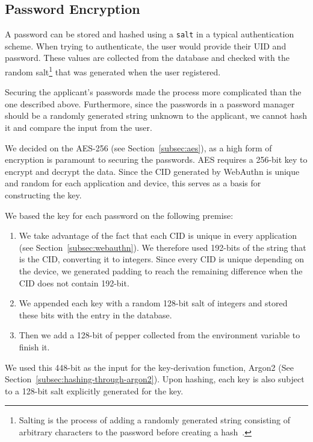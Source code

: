 \subsection{Password Encryption}\label{subsec:password-encryption}
A password can be stored and hashed using a \texttt{salt} in a typical
authentication scheme.
When trying to authenticate, the user would provide their UID and password.
These values are collected from the database and checked with the random
salt\footnote{
  Salting is the process of adding a randomly generated string consisting of
  arbitrary characters to the password before creating a hash~\cite{Kharod2015}.
} that was generated when the user registered.

Securing the applicant's passwords made the process more complicated than the
one described above.
Furthermore, since the passwords in a password manager should be a randomly
generated string unknown to the applicant, we cannot hash it and compare the
input from the user.

We decided on the AES-256 (see Section~\ref{subsec:aes}), as a high form of
encryption is paramount to securing the passwords.
AES requires a 256-bit key to encrypt and decrypt the data.
Since the CID generated by WebAuthn is unique and random for each application
and device, this serves as a basis for constructing the key.

We based the key for each password on the following premise:
\begin{enumerate}
  \item
  We take advantage of the fact that each CID is unique in every application
  (see Section~\ref{subsec:webauthn}).
  We therefore used 192-bits of the string that is the CID\@, converting it to
  integers.
  Since every CID is unique depending on the device, we generated padding to
  reach the remaining difference when the CID does not contain 192-bit.
  \item
  We appended each key with a random 128-bit salt of integers and stored these
  bits with the entry in the database.
  \item
  Then we add a 128-bit of pepper collected from the environment variable to
  finish it.
\end{enumerate}
We used this 448-bit as the input for the key-derivation function,
Argon2 (See Section~\ref{subsec:hashing-through-argon2}).
Upon hashing, each key is also subject to a 128-bit salt explicitly generated
for the key.

